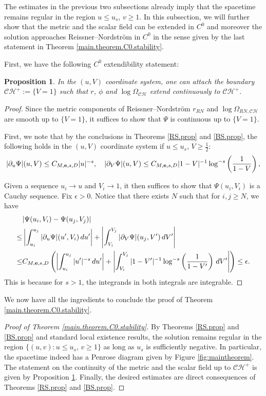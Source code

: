 \documentclass[10pt, reqno]{amsart}
\newtheorem{proposition}[theorem]{Proposition}
\theoremstyle{definition}
\theoremstyle{remark}
\numberwithin{equation}{section}
\newcommand{\ep}{\epsilon}
\newcommand{\rd}{\partial}
\newcommand{\0}{\emptyset}
\newcommand{\Omg}{\Omega}
\newcommand{\calC}{\mathcal C}
\newcommand{\calH}{\mathcal H}
\newcommand{\f}{\frac}
\newcommand{\CH}{\calC \calH^{+}}		%
\begin{document}
The estimates in the previous two subsections already imply that the spacetime remains regular in the region $u\leq u_s$, $v\geq 1$. In this subsection, we will further show that the metric and the scalar field can be extended in $C^0$ and moreover the solution approaches Reissner--Nordstr\"om in $C^0$ in the sense given by the last statement in Theorem \ref{main.theorem.C0.stability}. 

First, we have the following $C^0$ extendibility statement:
\begin{proposition}\label{C0.1}
In the $(u,V)$ coordinate system, one can attach the boundary $\CH:=\{V=1\}$ such that $r$, $\phi$ and $\log\Omg_{\mathcal C\mathcal H}$ extend continuously to $\CH$.
\end{proposition}
\begin{proof}
Since the metric components of Reissner--Nordstr\"om $r_{RN}$ and $\log\Omg_{RN,\mathcal C\mathcal H}$ are smooth up to $\{V=1\}$, it suffices to show that $\Psi$ is continuous up to $\{V=1\}$.

First, we note that by the conclusions in Theorems \ref{RS.prop} and \ref{BS.prop}, the following holds in the $(u,V)$ coordinate system if $u\leq u_s$, $V\geq \f 12$:
\begin{equation}\label{newcoord.bound}
|\rd_u\Psi|(u,V)\leq C_{M,{\bf e},s,D}|u|^{-s},\quad |\rd_V\Psi|(u,V)\leq C_{M,{\bf e},s,D}|1-V|^{-1}\log^{-s}\left(\f{1}{1-V}\right),
\end{equation}


Given a sequence $u_i\to u$ and $V_i\to 1$, it then suffices to show that $\Psi(u_i,V_i)$ is a Cauchy sequence. Fix $\ep>0$. Notice that there exists $N$ such that for $i,j\geq N$, we have
\begin{equation*}
\begin{split}
&|\Psi(u_i,V_i)-\Psi(u_j,V_j)|\\
\leq &\left|\int_{u_i}^{u_j}|\rd_u\Psi|(u',V_i) \,du'\right|+\left|\int_{V_i}^{V_j}|\rd_V\Psi|(u_j,V')\,d V'\right| \\
\leq &C_{M,{\bf e},s,D}\left(\left|\int_{u_i}^{u_j}|u'|^{-s} \,du'\right|+\left|\int_{V_i}^{V_j}|1-V'|^{-1}\log^{-s}\left(\f{1}{1-V'}\right)\,d V'\right| \right)\leq \ep.
\end{split}
\end{equation*}
This is because for $s>1$, the integrands in both integrals are integrable.
\end{proof}

We now have all the ingredients to conclude the proof of Theorem \ref{main.theorem.C0.stability}.
\begin{proof}[Proof of Theorem \ref{main.theorem.C0.stability}]
By Theorems \ref{RS.prop} and \ref{BS.prop} and standard local existence results, the solution remains regular in the region $\{(u,v):u\leq u_s,\,v\geq 1\}$ as long as $u_s$ is sufficiently negative. In particular, the spacetime indeed has a Penrose diagram given by Figure \ref{fig:maintheorem}. The statement on the continuity of the metric and the scalar field up to $\CH$ is given by Proposition \ref{C0.1}. Finally, the desired estimates are direct consequences of Theorems \ref{RS.prop} and \ref{BS.prop}.
\end{proof}
\end{document}
